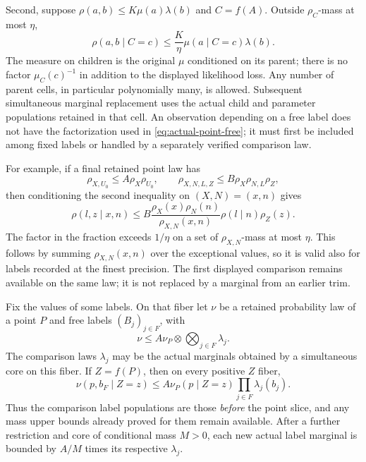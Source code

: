Second, suppose $\rho(a,b)\le K\mu(a)\lambda(b)$ and $C=f(A)$.
Outside $\rho_C$-mass at most $\eta$,
\begin{equation}
 \rho(a,b\mid C=c)\le\frac K\eta
                      \mu(a\mid C=c)\lambda(b).
 \label{eq:parent-product}
\end{equation}
The measure on children is the original $\mu$ conditioned on its parent;
there is no factor $\mu_C(c)^{-1}$ in addition to the displayed
likelihood loss.  Any number of parent cells, in particular polynomially
many, is allowed.  Subsequent simultaneous marginal replacement uses
the actual child and parameter populations retained in that cell.
An observation depending on a free label does not have the factorization
used in \eqref{eq:actual-point-free}; it must first be included among
fixed labels or handled by a separately verified comparison law.

For example, if a final retained point law has
\[
 \rho_{X,U_0}\le A\rho_X\rho_{U_0},\qquad
 \rho_{X,N,L,Z}\le B\rho_X\rho_{N,L}\rho_Z,
\]
then conditioning the second inequality on $(X,N)=(x,n)$ gives
\begin{equation}
 \rho(l,z\mid x,n)
 \le B\frac{\rho_X(x)\rho_N(n)}{\rho_{X,N}(x,n)}
                     \rho(l\mid n)\rho_Z(z).
 \label{eq:full-precision-slice}
\end{equation}
The factor in the fraction exceeds $1/\eta$ on a set of
$\rho_{X,N}$-mass at most $\eta$.
This follows by summing $\rho_{X,N}(x,n)$ over the exceptional
values, so it is valid also for labels recorded at the finest precision.
The first displayed comparison remains available on the same law;
it is not replaced by a marginal from an earlier trim.

\begin{corollary}
\label{cor:point-slicing}
Fix the values of some labels.  On that fiber let $\nu$ be a retained
probability law of a point $P$ and free labels $(B_j)_{j\in F}$,
with
\[
 \nu\le A\nu_P\otimes\bigotimes_{j\in F}\lambda_j.
\]
The comparison laws $\lambda_j$ may be the actual marginals obtained
by a simultaneous core on this fiber.  If $Z=f(P)$, then on every
positive $Z$ fiber,
\[
 \nu(p,b_F\mid Z=z)
 \le A\nu_P(p\mid Z=z)\prod_{j\in F}\lambda_j(b_j).
\]
Thus the comparison label populations are those \emph{before} the
point slice, and any mass upper bounds already proved for them remain
available.  After a further restriction and core of conditional mass
$M>0$, each new actual label marginal is bounded by
$A/M$ times its respective $\lambda_j$.
\end{corollary}

